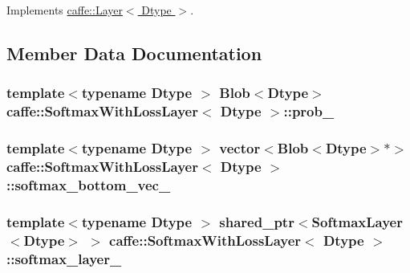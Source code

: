 Implements \hyperlink{classcaffe_1_1_layer_abd13c6489c13953b4fbcfcf6880835d0}{caffe\+::\+Layer$<$ Dtype $>$}.



\subsection{Member Data Documentation}
\hypertarget{classcaffe_1_1_softmax_with_loss_layer_a02669f20097006452d877ea05e98b775}{
\subsubsection[{prob\+\_\+}]{\setlength{\rightskip}{0pt plus 5cm}template$<$typename Dtype $>$ {\bf Blob}$<$Dtype$>$ {\bf caffe\+::\+Softmax\+With\+Loss\+Layer}$<$ Dtype $>$\+::prob\+\_\+\hspace{0.3cm}{\ttfamily [protected]}}}\label{classcaffe_1_1_softmax_with_loss_layer_a02669f20097006452d877ea05e98b775}
\hypertarget{classcaffe_1_1_softmax_with_loss_layer_aa39f89b673da5e6f86c6b1f79ced1270}{
\subsubsection[{softmax\+\_\+bottom\+\_\+vec\+\_\+}]{\setlength{\rightskip}{0pt plus 5cm}template$<$typename Dtype $>$ vector$<${\bf Blob}$<$Dtype$>$$\ast$$>$ {\bf caffe\+::\+Softmax\+With\+Loss\+Layer}$<$ Dtype $>$\+::softmax\+\_\+bottom\+\_\+vec\+\_\+\hspace{0.3cm}{\ttfamily [protected]}}}\label{classcaffe_1_1_softmax_with_loss_layer_aa39f89b673da5e6f86c6b1f79ced1270}
\hypertarget{classcaffe_1_1_softmax_with_loss_layer_ad5d63b5be7be681045f4e901de667035}{
\subsubsection[{softmax\+\_\+layer\+\_\+}]{\setlength{\rightskip}{0pt plus 5cm}template$<$typename Dtype $>$ shared\+\_\+ptr$<${\bf Softmax\+Layer}$<$Dtype$>$ $>$ {\bf caffe\+::\+Softmax\+With\+Loss\+Layer}$<$ Dtype $>$\+::softmax\+\_\+layer\+\_\+\hspace{0.3cm}{\ttfamily [protected]}}}\label{classcaffe_1_1_softmax_with_loss_layer_ad5d63b5be7be681045f4e901de667035}

